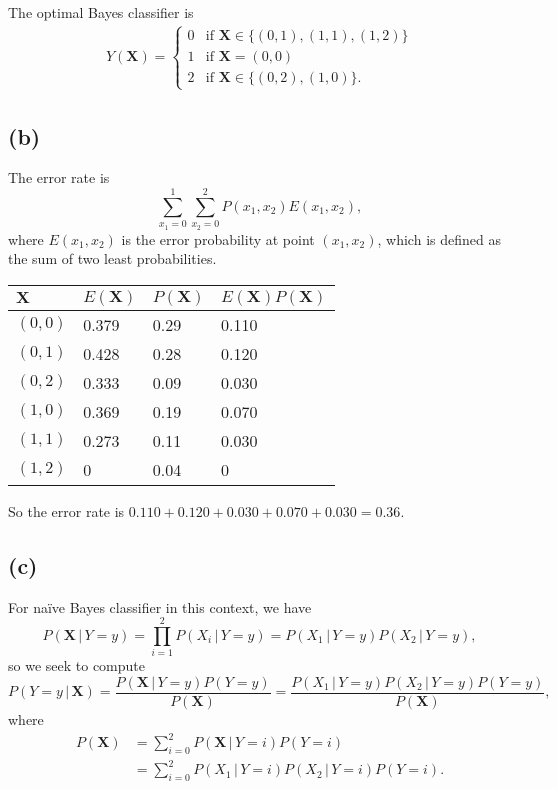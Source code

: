 \documentclass[10pt]{article}
\begin{document}
The optimal Bayes classifier is
\begin{align*}
Y(\textbf{X}) = \begin{cases}
0 & \mbox{if } \textbf{X} \in \{ (0, 1), (1, 1), (1, 2) \} \\ 
1 & \mbox{if } \textbf{X} = (0, 0) \\
2 & \mbox{if } \textbf{X} \in \{ (0, 2), (1, 0) \}.
\end{cases}
\end{align*}

\subsection*{(b)}
The error rate is 
\[
\sum_{x_1 = 0}^1 \sum_{x_2 = 0}^2 P(x_1, x_2)E(x_1, x_2),
\]
where $E(x_1, x_2)$ is the error probability at point $(x_1, x_2)$, which is defined as the sum of two least probabilities.
\begin{tabular}[H]{|l|l|l|l|}
\hline
$\textbf{X}$ & $E(\textbf{X})$ & $P(\textbf{X})$ & $E(\textbf{X})P(\textbf{X})$ \\
\hline
$(0, 0)$ & 0.379 & 0.29 & 0.110 \\
\hline
$(0, 1)$ & 0.428 & 0.28 & 0.120 \\
\hline
$(0, 2)$ & 0.333  & 0.09 & 0.030 \\
\hline
$(1, 0)$ & 0.369  & 0.19 & 0.070 \\
\hline
$(1, 1)$ & 0.273  & 0.11 & 0.030\\
\hline
$(1, 2)$ & 0 &  0.04 & 0 \\
\hline
\end{tabular}
So the error rate is $0.110 + 0.120 + 0.030 + 0.070 + 0.030 = 0.36$.

\subsection*{(c)}
For naïve Bayes classifier in this context, we have
\[
P(\textbf{X} \, | \, Y = y) = \prod_{i = 1}^2 P(X_i \, | \, Y = y) = P(X_1 \, | \, Y = y)P(X_2 \, | \, Y = y),
\]
so we seek to compute
\[
P(Y = y \, | \, \textbf{X}) = \frac{ P(\textbf{X} \, | \, Y = y)P(Y = y) }{ P(\textbf{X}) } = \frac{ P(X_1 \, | \, Y = y) P(X_2 \, | \, Y = y) P(Y = y) }{ P(\textbf{X}) },
\]
where 
\begin{align*}
P(\textbf{X}) &= \sum_{i = 0}^2 P(\textbf{X} \, | \, Y = i)P(Y = i) \\
                    &= \sum_{i = 0}^2 P(X_1 \, | \, Y =i)P(X_2 \, | \, Y = i)P(Y = i).
\end{align*}
\end{document}
